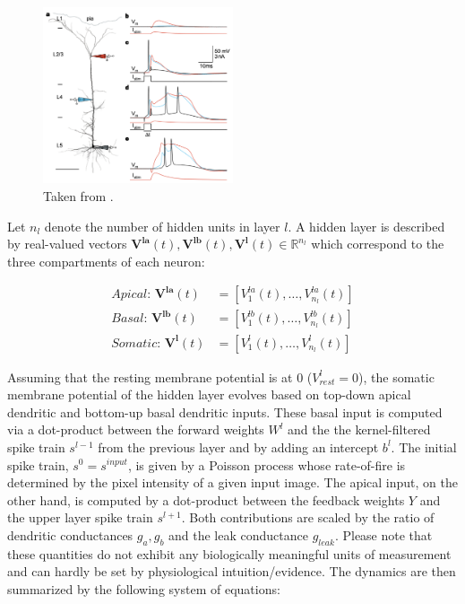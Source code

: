 \documentclass[colorinlistoftodos]{article}
\theoremstyle{definition}
\begin{document}
\begin{figure}
\centering
\includegraphics[width=0.5\textwidth]{../figures/report/pyramidal_plateu}
\caption{\label{fig:pyramidal} Taken from \citet{larkum_1999}. }
\end{figure}
 
Let $n_{l}$ denote the number of hidden units in layer $l$. A hidden layer is described by real-valued vectors $\mathbf{V^{la}}(t), \mathbf{V^{lb}}(t), \mathbf{V^{l}}(t) \in \mathbb{R}^{n_l}$ which correspond to the three compartments of each neuron:

\begin{align*}
	\textit{Apical:  } \mathbf{V^{la}}(t) &= [V_1^{la}(t), \dots, V_{n_l}^{la}(t)]\\
	\textit{Basal:  } \mathbf{V^{lb}}(t) &= [V_1^{lb}(t), \dots, V_{n_l}^{lb}(t)]\\
	\textit{Somatic:  }\mathbf{V^{l}}(t) &= [V_1^{l}(t), \dots, V_{n_l}^{l}(t)]
\end{align*}

Assuming that the resting membrane potential is at 0 ($V^l_{rest}=0$), the somatic membrane potential of the hidden layer evolves based on top-down apical dendritic and bottom-up basal dendritic inputs. 
These basal input is computed via a dot-product between the forward weights $W^l$ and the the kernel-filtered spike train $s^{l-1}$ from the previous layer and by adding an intercept $b^l$. The initial spike train, $s^0 = s^{input}$, is given by a Poisson process whose rate-of-fire is determined by the pixel intensity of a given input image. 
The apical input, on the other hand, is computed by a dot-product between the feedback weights $Y$ and the upper layer spike train $s^{l+1}$. Both contributions are scaled by the ratio of dendritic conductances $g_a, g_b$ and the leak conductance $g_{leak}$. Please note that these quantities do not exhibit any biologically meaningful units of measurement and can hardly be set by physiological intuition/evidence.
The dynamics are then summarized by the following system of equations:
\end{document}
